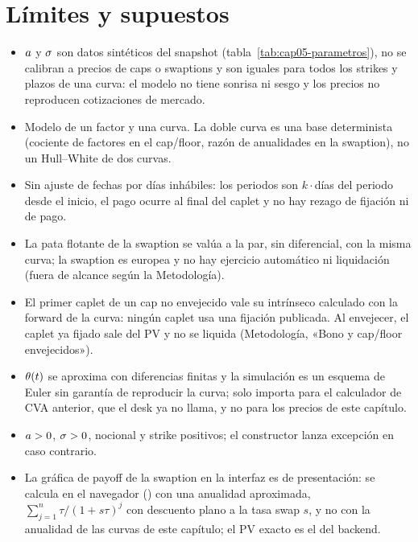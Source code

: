 \section{Límites y supuestos}\label{sec:cap05-limites}

\begin{limites}
  \begin{itemize}
    \item $a$ y $\sigma$ son datos sintéticos del snapshot (tabla~\ref{tab:cap05-parametros}), no se
          calibran a precios de caps o swaptions y son iguales para todos los strikes y plazos de una curva:
          el modelo no tiene sonrisa ni sesgo y los precios no reproducen cotizaciones de mercado.
    \item Modelo de un factor y una curva. La doble curva es una base determinista (cociente de factores en el
          cap/floor, razón de anualidades en la swaption), no un Hull--White de dos curvas.
    \item Sin ajuste de fechas por días inhábiles: los periodos son $k\cdot$días del periodo desde el inicio, el
          pago ocurre al final del caplet y no hay rezago de fijación ni de pago.
    \item La pata flotante de la swaption se valúa a la par, sin diferencial, con la misma curva; la swaption
          es europea y no hay ejercicio automático ni liquidación (fuera de alcance según la Metodología).
    \item El primer caplet de un cap no envejecido vale su intrínseco calculado con la forward de la curva:
          ningún caplet usa una fijación publicada. Al envejecer, el caplet ya fijado sale del PV y no se
          liquida (Metodología, «Bono y cap/floor envejecidos»).
    \item $\theta(t)$ se aproxima con diferencias finitas y la simulación es un esquema de Euler sin garantía de
          reproducir la curva; solo importa para el calculador de CVA anterior, que el desk ya no llama, y no para los precios de este capítulo.
    \item $a>0$, $\sigma>0$, nocional y strike positivos; el constructor lanza excepción en caso contrario.
    \item La gráfica de payoff de la swaption en la interfaz es de presentación: se calcula en el navegador
          () con una anualidad aproximada,
          $\sum_{j=1}^{n}\tau/(1+s\tau)^j$ con descuento plano a la tasa swap $s$, y no con la anualidad de las curvas
          de este capítulo; el PV exacto es el del backend.
  \end{itemize}
\end{limites}

